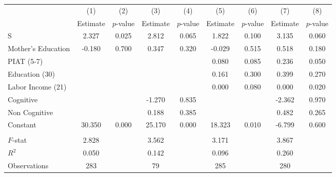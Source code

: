 \begin{tabular}{lcccccccc} \toprule
 & (1) & (2) & (3) & (4) & (5) & (6) & (7) & (8) \\ 
 & Estimate  & $p$-value  & Estimate  & $p$-value  & Estimate  & $p$-value  & Estimate  & $p$-value  \\  \midrule
S &     2.327 &     0.025 &     2.812 &     0.065 &     1.822 &     0.100 &     3.135 &     0.060 \\  
Mother's Education &    -0.180 &     0.700 &     0.347 &     0.320 &    -0.029 &     0.515 &     0.518 &     0.180 \\  
PIAT (5-7) &         &         &         &         &     0.080 &     0.085 &     0.236 &     0.050 \\  
Education (30) &         &         &         &         &     0.161 &     0.300 &     0.399 &     0.270 \\  
Labor Income (21) &         &         &         &         &     0.000 &     0.080 &     0.000 &     0.020 \\  
Cognitive &         &         &    -1.270 &     0.835 &         &         &    -2.362 &     0.970 \\  
Non Cognitive &         &         &     0.188 &     0.385 &         &         &     0.482 &     0.265 \\  
Constant &    30.350 &     0.000 &    25.170 &     0.000 &    18.323 &     0.010 &    -6.799 &     0.600 \\ \\ \midrule  
$F$-stat &     2.828 &         &     3.562 &         &     3.171 &         &     3.867 &         \\
$R^2$ &     0.050 &         &     0.142 &         &     0.096 &         &     0.260 &         \\
Observations &   283 &         &    79 &         &   285 &         &   280 &         \\
\bottomrule \end{tabular}